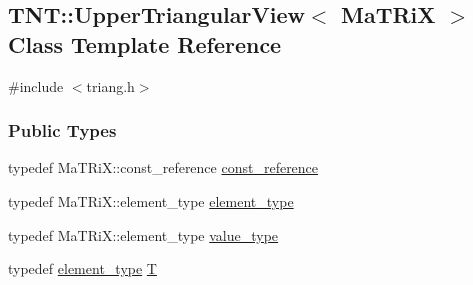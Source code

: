 \subsection{TNT::UpperTriangularView$<$ MaTRiX $>$ Class Template Reference}
\label{class_t_n_t_1_1_upper_triangular_view}


{\ttfamily \#include $<$triang.h$>$}

\subsubsection*{Public Types}
\begin{DoxyCompactItemize}
\item 
typedef MaTRiX::const\_\-reference \hyperlink{class_t_n_t_1_1_upper_triangular_view_aff1028a5fbca2d7cddb5a62809da560e}{const\_\-reference}
\item 
typedef MaTRiX::element\_\-type \hyperlink{class_t_n_t_1_1_upper_triangular_view_afa870480432586c7887f51a82099688f}{element\_\-type}
\item 
typedef MaTRiX::element\_\-type \hyperlink{class_t_n_t_1_1_upper_triangular_view_ab9edb529b3df27cb6816d071f46df5c0}{value\_\-type}
\item 
typedef \hyperlink{class_t_n_t_1_1_upper_triangular_view_afa870480432586c7887f51a82099688f}{element\_\-type} \hyperlink{class_t_n_t_1_1_upper_triangular_view_a7b7340647274183694dd2729e1993aea}{T}
\end{DoxyCompactItemize}
